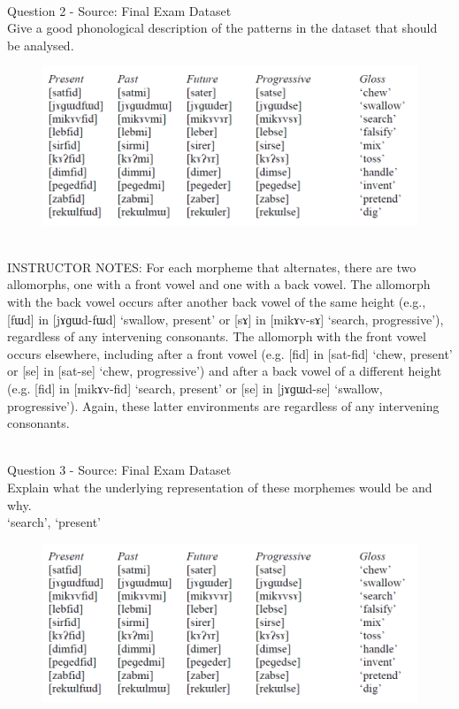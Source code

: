 \documentclass[12pt]{article}
\begin{document}
~\\

{\large Question 2} - Source: Final Exam Dataset\\

Give a good phonological description of the patterns in the dataset that should be analysed.\\

\begin{figure}[H]
\includegraphics{../images/final_dataset.png}
\end{figure}

~\\
INSTRUCTOR NOTES: For each morpheme that alternates, there are two allomorphs, one with a front vowel and one with a back vowel. The allomorph with the back vowel occurs after another back vowel of the same height (e.g., [fɯd] in [jɤɡɯd-fɯd] ‘swallow, present’ or [sɤ] in [mikɤv-sɤ] ‘search, progressive’), regardless of any intervening consonants. The allomorph with the front vowel occurs elsewhere, including after a front vowel (e.g. [fid] in [sat-fid] ‘chew, present’ or [se] in [sat-se] ‘chew, progressive’) and after a back vowel of a different height (e.g. [fid] in [mikɤv-fid] ‘search, present’ or [se] in [jɤɡɯd-se] ‘swallow, progressive’). Again, these latter environments are regardless of any intervening consonants.


~\\

{\large Question 3} - Source: Final Exam Dataset\\

Explain what the underlying representation of these morphemes would be and why.\\

`search', `present'

\begin{figure}[H]
\includegraphics{../images/final_dataset.png}
\end{figure}
\end{document}
